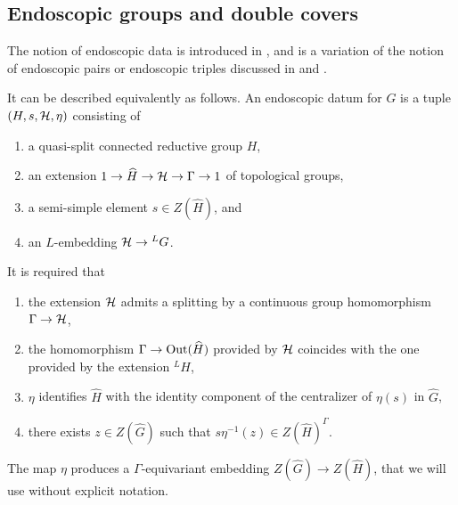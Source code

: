 \documentclass{article}
\theoremstyle{definition}
\numberwithin{equation}{section}
\renewcommand{\-}{\hyp{}}
\begin{document}


\subsection{Endoscopic groups and double covers} \label{sub:covendo}

The notion of endoscopic data is introduced in \cite[\S1.2]{LS87}, and is a variation of the notion of endoscopic pairs or endoscopic triples discussed in \cite{Kot84} and \cite{Kot86}.

It can be described equivalently as follows. An endoscopic datum for $G$ is a tuple $(H,s,\mathcal{H},\eta)$ consisting of
\begin{enumerate}[label=(\arabic*)]
	\item a quasi-split connected reductive group $H$,
	\item an extension $1 \to \widehat H \to \mathcal{H} \to \Gamma \to 1$ of topological groups,
	\item a semi-simple element $s \in Z(\hat H)$, and
	\item an $L$\-embedding $\mathcal{H} \to {^LG}$.
\end{enumerate}
It is required that
\begin{enumerate}[label=(\alph*)]
	\item the extension $\mathcal{H}$ admits a splitting by a continuous group homomorphism $\Gamma \to \mathcal{H}$,
	\item the homomorphism $\Gamma \to \textrm{Out}(\widehat H)$ provided by $\mathcal{H}$ coincides with the one provided by the extension $^LH$,
	\item $\eta$ identifies $\hat H$ with the identity component of the centralizer of $\eta(s)$ in $\hat G$,
	\item there exists $z \in Z(\hat G)$ such that $s\eta^{-1}(z) \in Z(\hat H)^\Gamma$.
\end{enumerate}
The map $\eta$ produces a $\Gamma$-equivariant embedding $Z(\hat G) \to Z(\hat H)$, that we will use without explicit notation.
\end{document}
